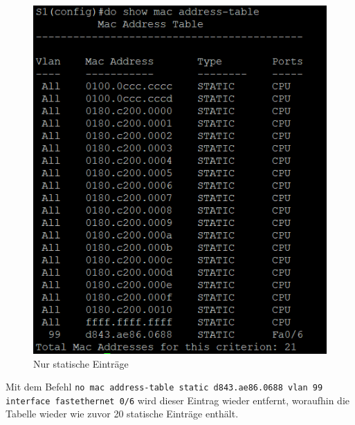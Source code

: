 \documentclass[a4paper]{article}
\newcommand{\abc}{\hfill \break}
\begin{document}
\begin{figure}[h]
	\centering
	\includegraphics[scale=0.4]{images/thign.png}
	\caption{Nur statische Einträge}
\end{figure}\abc


Mit dem Befehl \texttt{no mac address-table static d843.ae86.0688 vlan 99 interface fastethernet 0/6} wird dieser Eintrag wieder entfernt, woraufhin die Tabelle wieder wie zuvor 20 statische Einträge enthält.
\end{document}
